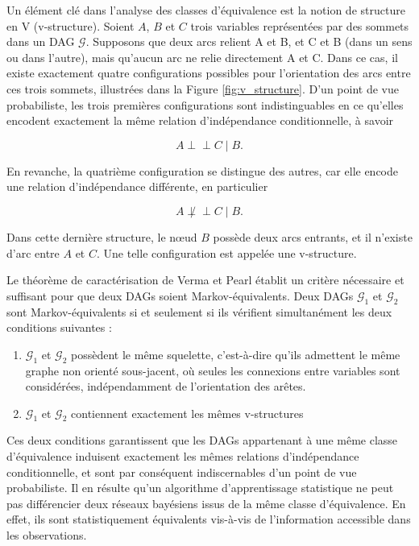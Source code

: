 \documentclass{article}
\newcommand\independent{\perp\!\!\!\!\!\!\perp}
\begin{document}
Un élément clé dans l'analyse des classes d'équivalence est la notion de structure en V (v-structure).
Soient $A$, $B$ et $C$ trois variables représentées par des sommets dans un DAG $\mathcal{G}$. Supposons que deux
arcs relient A et B, et C et B (dans un sens ou dans l'autre), mais qu'aucun arc ne relie directement A et C.
Dans ce cas, il existe exactement quatre configurations possibles pour l'orientation des arcs entre ces trois
sommets, illustrées dans la Figure \ref{fig:v_structure}. D'un point de vue probabiliste, les trois premières configurations sont
indistinguables en ce qu'elles encodent exactement la même relation d'indépendance conditionnelle, à savoir

$$
    A \independent C \mid B.
$$

En revanche, la quatrième configuration se distingue des autres, car elle encode une relation d'indépendance différente,
en particulier

$$
    A \not\independent C \mid B.
$$

Dans cette dernière structure, le nœud $B$ possède deux arcs entrants, et il n'existe d'arc entre $A$ et $C$. Une
telle configuration est appelée une v-structure.

Le théorème de caractérisation de Verma et Pearl \cite{10.5555/534975} établit un critère nécessaire et suffisant
pour que deux DAGs soient Markov-équivalents. Deux DAGs $\mathcal{G}_1$ et $\mathcal{G}_2$ sont Markov-équivalents
si et seulement si ils vérifient simultanément les deux conditions suivantes :

\begin{enumerate}[label=(\roman*)]
    \item $\mathcal{G}_1$ et $\mathcal{G}_2$ possèdent le même squelette, c'est-à-dire qu'ils admettent
          le même graphe non orienté sous-jacent, où seules les connexions entre variables sont considérées,
          indépendamment de l'orientation des arêtes.
    \item $\mathcal{G}_1$ et $\mathcal{G}_2$ contiennent exactement les mêmes v-structures
\end{enumerate}


Ces deux conditions garantissent que les DAGs appartenant à une même classe d'équivalence induisent exactement
les mêmes relations d'indépendance conditionnelle, et sont par conséquent indiscernables d'un point de vue
probabiliste. Il en résulte qu'un algorithme d'apprentissage statistique ne peut pas différencier deux réseaux
bayésiens issus de la même classe d'équivalence. En effet, ils sont statistiquement équivalents vis-à-vis de
l'information accessible dans les observations.
\end{document}
